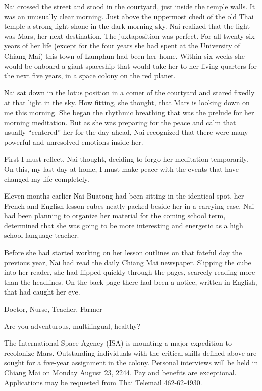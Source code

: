 \documentclass[]{article}
\begin{document}
{Nai crossed the street and stood in the courtyard, just inside the temple walls. It was an unusually clear morning. Just above the uppermost chedi of the old Thai temple a strong light shone in the dark morning sky. Nai realized that the light was Mars, her next destination. The juxtaposition was perfect. For all twenty-six years of her life (except for the four years she had spent at the University of Chiang Mai) this town of Lamphun had been her home. Within six weeks she would be onboard a giant spaceship that would take her to her living quarters for the next five years, in a space colony on the red planet.

Nai sat down in the lotus position in a comer of the courtyard and stared fixedly at that light in the sky. How fitting, she thought, that Mars is looking down on me this morning. She began the rhythmic breathing that was the prelude for her morning meditation. But as she was preparing for the peace and calm that usually “centered” her for the day ahead, Nai recognized that there were many powerful and unresolved emotions inside her.

First I must reflect, Nai thought, deciding to forgo her meditation temporarily. On this, my last day at home, I must make peace with the events that have changed my life completely.

Eleven months earlier Nai Buatong had been sitting in the identical spot, her French and English lesson cubes neatly packed beside her in a carrying case. Nai had been planning to organize her material for the coming school term, determined that she was going to be more interesting and energetic as a high school language teacher.

Before she had started working on her lesson outlines on that fateful day the previous year, Nai had read the daily Chiang Mai newspaper. Slipping the cube into her reader, she had flipped quickly through the pages, scarcely reading more than the headlines. On the back page there had been a notice, written in English, that had caught her eye.

Doctor, Nurse, Teacher, Farmer

Are you adventurous, multilingual, healthy?

The International Space Agency (ISA) is mounting a major expedition to recolonize Mars. Outstanding individuals with the critical skills defined above are sought for a five-year assignment in the colony. Personal interviews will be held in Chiang Mai on Monday August 23, 2244. Pay and benefits are exceptional. Applications may be requested from Thai Telemail  462-62-4930.

}
\end{document}
